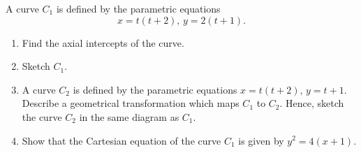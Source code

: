 \begin{solution}
\begin{ppart}
\begin{center}
        \end{center}
    \end{ppart}
\end{solution}

\clearpage
\begin{problem}
    A curve $C_1$ is defined by the parametric equations \[x = t(t+2), \, y = 2(t+1).\]

    \begin{enumerate}
        \item Find the axial intercepts of the curve.
        \item Sketch $C_1$.
        \item A curve $C_2$ is defined by the parametric equations $x = t(t+2), \, y = t+1$. Describe a geometrical transformation which maps $C_1$ to $C_2$. Hence, sketch the curve $C_2$ in the same diagram as $C_1$.
        \item Show that the Cartesian equation of the curve $C_1$ is given by $y^2 = 4(x+1)$.
    \end{enumerate}
\end{problem}
